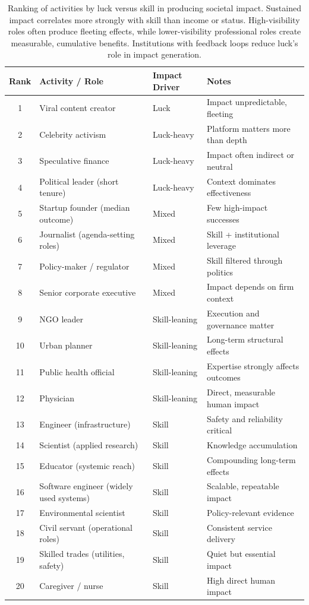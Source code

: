   \begin{table}[H]
    \centering
    \small
    \begin{tabular}{clll}
      \toprule
      \textbf{Rank} & \textbf{Activity / Role} & \textbf{Impact Driver} & \textbf{Notes} \\
      \midrule
      1 & Viral content creator & Luck & Impact unpredictable, fleeting \\
      2 & Celebrity activism & Luck-heavy & Platform matters more than depth \\
      3 & Speculative finance & Luck-heavy & Impact often indirect or neutral \\
      4 & Political leader (short tenure) & Luck-heavy & Context dominates effectiveness \\
      5 & Startup founder (median outcome) & Mixed & Few high-impact successes \\
      6 & Journalist (agenda-setting roles) & Mixed & Skill + institutional leverage \\
      7 & Policy-maker / regulator & Mixed & Skill filtered through politics \\
      8 & Senior corporate executive & Mixed & Impact depends on firm context \\
      9 & NGO leader & Skill-leaning & Execution and governance matter \\
      10 & Urban planner & Skill-leaning & Long-term structural effects \\
      11 & Public health official & Skill-leaning & Expertise strongly affects outcomes \\
      12 & Physician & Skill-leaning & Direct, measurable human impact \\
      13 & Engineer (infrastructure) & Skill & Safety and reliability critical \\
      14 & Scientist (applied research) & Skill & Knowledge accumulation \\
      15 & Educator (systemic reach) & Skill & Compounding long-term effects \\
      16 & Software engineer (widely used systems) & Skill & Scalable, repeatable impact \\
      17 & Environmental scientist & Skill & Policy-relevant evidence \\
      18 & Civil servant (operational roles) & Skill & Consistent service delivery \\
      19 & Skilled trades (utilities, safety) & Skill & Quiet but essential impact \\
      20 & Caregiver / nurse & Skill & High direct human impact \\
      \bottomrule
    \end{tabular}
    \caption{Ranking of activities by luck versus skill in producing societal impact. Sustained impact correlates more strongly with skill than income or status. High-visibility roles often produce fleeting effects, while lower-visibility professional roles create measurable, cumulative benefits. Institutions with feedback loops reduce luck's role in impact generation.}
    \label{tab:impact_rankings}
  \end{table}

